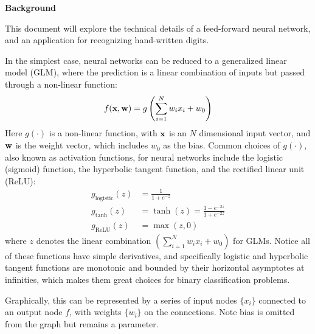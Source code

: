 
\Large
{\bf Background}

\normalsize
This document will explore the technical details of a feed-forward 
neural network, 
and an application for recognizing hand-written digits.

In the simplest case, neural networks can be reduced to 
a generalized linear model (GLM),
where the prediction is a linear combination of inputs
but passed through a non-linear function:
%
\begin{equation}
	f(\mathbf{x},\mathbf{w}) = g\left( \sum_{i=1}^N w_i x_i + w_0 \right)
\end{equation}
%
\indent Here $g(\cdot)$ is a non-linear function, 
with $\mathbf{x}$ is an $N$ dimensional input vector,
and $\mathbf{w}$ is the weight vector,
which includes $w_0$ as the bias.
Common choices of $g(\cdot)$, also known as activation functions,
for neural networks 
include the logistic (sigmoid) function, the hyperbolic tangent function, 
and the rectified linear unit (ReLU):
%
\begin{equation}
\begin{aligned}
	g_{\text{logistic}}(z) &= \frac{1}{1+e^{-z}} \\
	g_{\text{tanh}}(z) &= \tanh(z) = \frac{1 - e^{-2z}}{1 + e^{-2z}}\\
	g_\text{ReLU}(z) &= \max(z,0)
\end{aligned}
\end{equation}
%
where $z$ denotes the linear combination
$\left( \sum_{i=1}^N w_i x_i + w_0 \right)$ for GLMs.
Notice all of these functions have simple derivatives,
and specifically logistic and hyperbolic tangent functions 
are monotonic and bounded by their horizontal asymptotes at infinities,
which makes them great choices for binary classification problems.

Graphically, this can be represented by a series of 
input nodes $\{x_i\}$ connected to an output node $f$,
with weights $\{w_i\}$ on the connections.
Note bias is omitted from the graph but remains a parameter.

